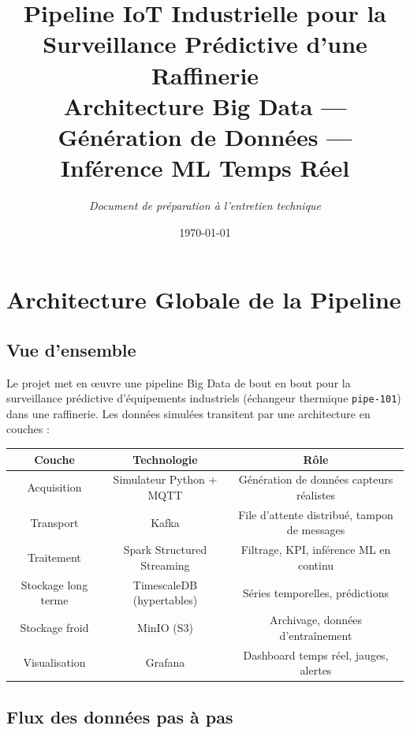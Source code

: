\documentclass[12pt,a4paper]{article}
\title{\textbf{Pipeline IoT Industrielle pour la Surveillance Prédictive d'une Raffinerie}\\[1em]
\large Architecture Big Data --- Génération de Données --- Inférence ML Temps Réel}
\author{\textit{Document de préparation à l'entretien technique}}
\date{\today}
\begin{document}
\maketitle
\thispagestyle{empty}
\newpage

\tableofcontents
\newpage

\section{Architecture Globale de la Pipeline}
\label{sec:pipeline}

\subsection{Vue d'ensemble}

Le projet met en œuvre une pipeline Big Data de bout en bout pour la surveillance prédictive d'équipements industriels (échangeur thermique \texttt{pipe-101}) dans une raffinerie. Les données simulées transitent par une architecture en couches :

\begin{center}
\small
\begin{tabular}{|c|c|c|}
\hline
\textbf{Couche} & \textbf{Technologie} & \textbf{Rôle} \\
\hline
Acquisition & Simulateur Python + MQTT & Génération de données capteurs réalistes \\
\hline
Transport & Kafka & File d'attente distribué, tampon de messages \\
\hline
Traitement & Spark Structured Streaming & Filtrage, KPI, inférence ML en continu \\
\hline
Stockage long terme & TimescaleDB (hypertables) & Séries temporelles, prédictions \\
\hline
Stockage froid & MinIO (S3) & Archivage, données d'entraînement \\
\hline
Visualisation & Grafana & Dashboard temps réel, jauges, alertes \\
\hline
\end{tabular}
\end{center}

\subsection{Flux des données pas à pas}
\end{document}

